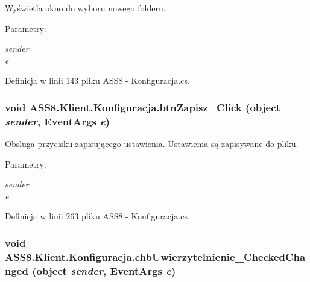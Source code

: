 Wyświetla okno do wyboru nowego folderu. 

\begin{Desc}
\item[Parametry:]
\begin{description}
\item[{\em sender}]\item[{\em e}]\end{description}
\end{Desc}


Definicja w linii 143 pliku ASS8 - Konfiguracja.cs.\hypertarget{a00014_12f013346e6d02fe69877467ca551ef3}{
\subsubsection[{btnZapisz\_\-Click}]{\setlength{\rightskip}{0pt plus 5cm}void ASS8.Klient.Konfiguracja.btnZapisz\_\-Click (object {\em sender}, \/  EventArgs {\em e})}}
\label{d2/de7/a00014_12f013346e6d02fe69877467ca551ef3}


Obsluga przycisku zapisującego \hyperlink{a00028}{ustawienia}. Ustawienia są zapisywane do pliku. 

\begin{Desc}
\item[Parametry:]
\begin{description}
\item[{\em sender}]\item[{\em e}]\end{description}
\end{Desc}


Definicja w linii 263 pliku ASS8 - Konfiguracja.cs.\hypertarget{a00014_4d234b74e7e673575fb90c7b41cdd79c}{
\subsubsection[{chbUwierzytelnienie\_\-CheckedChanged}]{\setlength{\rightskip}{0pt plus 5cm}void ASS8.Klient.Konfiguracja.chbUwierzytelnienie\_\-CheckedChanged (object {\em sender}, \/  EventArgs {\em e})}}
\label{d2/de7/a00014_4d234b74e7e673575fb90c7b41cdd79c}


